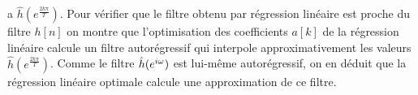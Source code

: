 a $\hat h (e ^{\frac {2 k \pi} T})$.
Pour v\'erifier que le filtre obtenu par r\'egression lin\'eaire
est proche du filtre $h[n]$ on montre que l'optimisation des
coefficients $a[k]$ de la r\'egression lin\'eaire calcule un filtre
autor\'egressif qui interpole approximativement
les valeurs $\hat h (e ^{\frac {2 k \pi} T})$.
Comme le filtre $\hat h ({e ^{i \omega}})$ est lui-m\^eme autor\'egressif,
on en d\'eduit que
la r\'egression lin\'eaire optimale calcule une approximation
de ce filtre.
%
